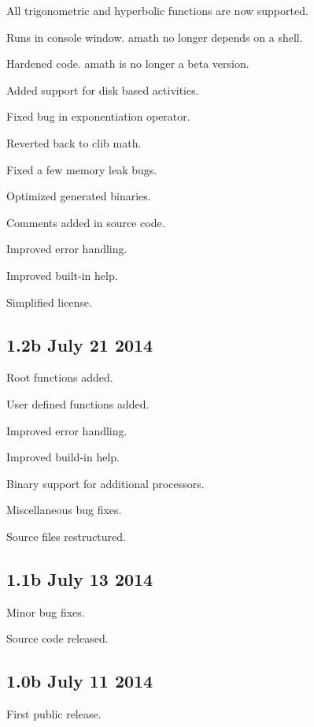 \begin{DoxyItemize}
\item All trigonometric and hyperbolic functions are now supported.
\item Runs in console window. amath no longer depends on a shell.
\item Hardened code. amath is no longer a beta version.
\item Added support for disk based activities.
\item Fixed bug in exponentiation operator.
\item Reverted back to clib math.
\item Fixed a few memory leak bugs.
\item Optimized generated binaries.
\item Comments added in source code.
\item Improved error handling.
\item Improved built-\/in help.
\item Simplified license.
\end{DoxyItemize}\hypertarget{release_page_version12b}{}\subsection{1.\+2b July 21 2014}\label{release_page_version12b}

\begin{DoxyItemize}
\item Root functions added.
\item User defined functions added.
\item Improved error handling.
\item Improved build-\/in help.
\item Binary support for additional processors.
\item Miscellaneous bug fixes.
\item Source files restructured.
\end{DoxyItemize}\hypertarget{release_page_version11b}{}\subsection{1.\+1b July 13 2014}\label{release_page_version11b}

\begin{DoxyItemize}
\item Minor bug fixes.
\item Source code released.
\end{DoxyItemize}\hypertarget{release_page_version10b}{}\subsection{1.\+0b July 11 2014}\label{release_page_version10b}

\begin{DoxyItemize}
\item First public release. 
\end{DoxyItemize}